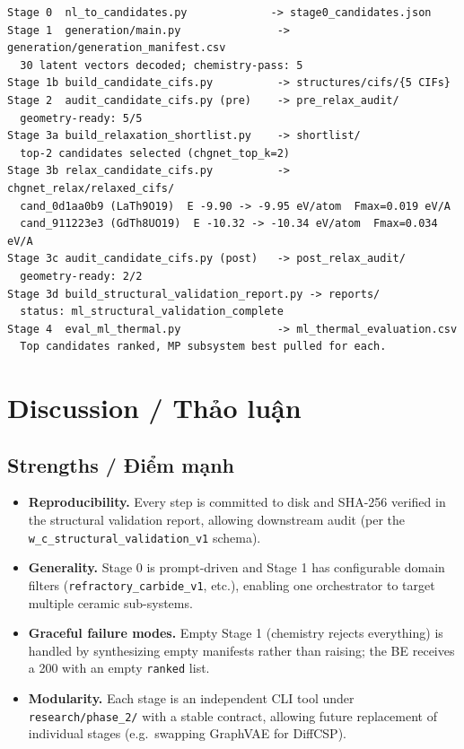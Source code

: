 \documentclass[11pt,a4paper]{report}
\begin{document}
\begin{lstlisting}[language={},caption={Pipeline stdout excerpt.},label={lst:runout}]
Stage 0  nl_to_candidates.py             -> stage0_candidates.json
Stage 1  generation/main.py               -> generation/generation_manifest.csv
  30 latent vectors decoded; chemistry-pass: 5
Stage 1b build_candidate_cifs.py          -> structures/cifs/{5 CIFs}
Stage 2  audit_candidate_cifs.py (pre)    -> pre_relax_audit/
  geometry-ready: 5/5
Stage 3a build_relaxation_shortlist.py    -> shortlist/
  top-2 candidates selected (chgnet_top_k=2)
Stage 3b relax_candidate_cifs.py          -> chgnet_relax/relaxed_cifs/
  cand_0d1aa0b9 (LaTh9O19)  E -9.90 -> -9.95 eV/atom  Fmax=0.019 eV/A
  cand_911223e3 (GdTh8UO19)  E -10.32 -> -10.34 eV/atom  Fmax=0.034 eV/A
Stage 3c audit_candidate_cifs.py (post)   -> post_relax_audit/
  geometry-ready: 2/2
Stage 3d build_structural_validation_report.py -> reports/
  status: ml_structural_validation_complete
Stage 4  eval_ml_thermal.py               -> ml_thermal_evaluation.csv
  Top candidates ranked, MP subsystem best pulled for each.
\end{lstlisting}

\chapter{Discussion / Thảo luận}

\section{Strengths / Điểm mạnh}

\begin{itemize}[leftmargin=*,itemsep=2pt]
\item \textbf{Reproducibility.} Every step is committed to disk and SHA-256 verified in the
      structural validation report, allowing downstream audit (per the
      \texttt{w\_c\_structural\_validation\_v1} schema).
\item \textbf{Generality.} Stage 0 is prompt-driven and Stage 1 has configurable domain
      filters (\texttt{refractory\_carbide\_v1}, etc.), enabling one orchestrator to
      target multiple ceramic sub-systems.
\item \textbf{Graceful failure modes.} Empty Stage 1 (chemistry rejects everything) is
      handled by synthesizing empty manifests rather than raising; the BE receives a 200
      with an empty \texttt{ranked} list.
\item \textbf{Modularity.} Each stage is an independent CLI tool under
      \texttt{research/phase\_2/} with a stable contract, allowing future replacement of
      individual stages (e.g.\ swapping GraphVAE for DiffCSP).
\end{itemize}
\end{document}
